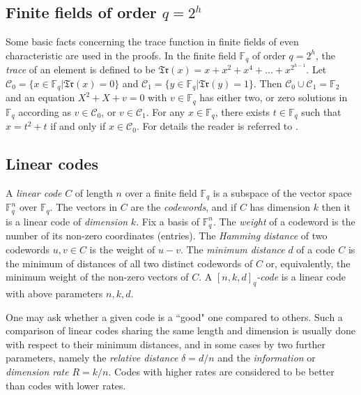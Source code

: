 \documentclass[sn-mathphys-num]{sn-jnl}%
\begin{document}
\subsection{Finite fields of order $q=2^h$}
Some basic facts concerning the trace function in finite fields of even characteristic are used in the proofs.
In the finite field $\mathbb{F}_q$ of order $q=2^h$, the \emph{trace} of an element is defined to be
$\mathfrak{Tr}(x)=x+x^2+x^4+\ldots+x^{2^{h-1}}$. Let $\mathcal{C}_0=\{x\in\mathbb{F}_q|\mathfrak{Tr}(x)=0\}$ and $\mathcal{C}_1=\{y\in\mathbb{F}_q|\mathfrak{Tr}(y)=1\}.$ Then $\mathcal{C}_0\cup \mathcal{C}_1=\mathbb{F}_2$ and  an equation $X^2+X+v=0$ with $v\in \mathbb{F}_q$ has either two, or zero solutions in $\mathbb{F}_q$ according as $v\in \mathcal{C}_0$, or $v\in \mathcal{C}_1$. For any $x\in \mathbb{F}_q$, there exists  $t\in\mathbb{F}_q$ such that $x=t^2+t$ if and only if $x\in\mathcal{C}_0$. For details the reader is referred to \cite{HJWP}.

\subsection{Linear codes}
A \emph{linear code} $ C $ of length $ n $ over a finite field $\mathbb{F}_q$ is a subspace of the vector space $\mathbb{F}_q^n$ over $\mathbb{F}_q$. The vectors in $C$ are the \emph{codewords}, and  if $C$ has dimension $k$ then it is a linear code of \emph{dimension} $k$. Fix a basis of $\mathbb{F}_q^n$. The \emph{weight} of a codeword is the number of its non-zero coordinates (entries). The \textit{Hamming distance} of two codewords $u,v\in C$ is the weight of $u-v $. The \textit{minimum distance} $d$ of a code $ C $ is the minimum of distances of all two distinct codewords of $ C$ or, equivalently, the minimum weight of the non-zero vectors of $C$. A $[n,k,d]_q $\emph{-code} is a linear code with above parameters $n,k,d$.

One may ask whether a given code is a ``good" one compared to others. Such a comparison of linear codes sharing  the same length and dimension is usually done with respect to their minimum distances, and in some cases by two further parameters, namely the \emph{relative distance} $\delta=d/n$ and the \emph{information} or \emph{dimension rate}  $R=k/n$. Codes with higher rates are considered to be better than codes with lower rates.
\end{document}

